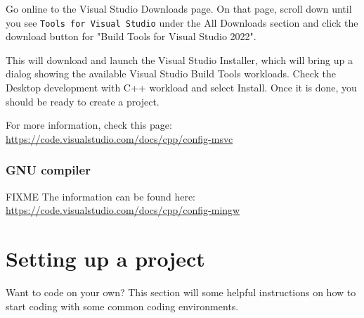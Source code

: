 Go online to the Visual Studio Downloads page. On that page, scroll
down until you see {\tt Tools for Visual Studio} under the All Downloads section and click the download button for "Build Tools for Visual Studio 2022".

This will download and launch the Visual Studio Installer, which will bring up a dialog showing the available Visual Studio Build Tools workloads. Check the Desktop development with C++ workload and select Install. Once it is done, you should be ready to create a project.

For more information, check this page:
\url{https://code.visualstudio.com/docs/cpp/config-msvc }
\subsubsection{GNU compiler}
FIXME
The information can be found here: \url{https://code.visualstudio.com/docs/cpp/config-mingw}
\section{Setting up a project}
\label{setupproject}
Want to code on your own? This section will some helpful instructions on
how to start coding with some common coding environments.
